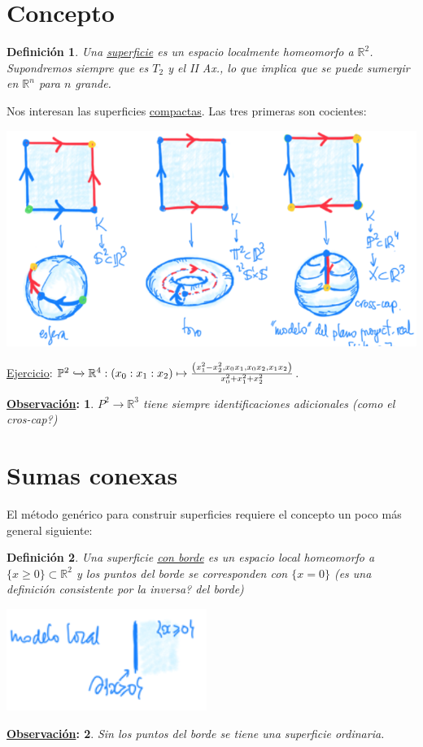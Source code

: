\documentclass[10pt,a4paper,openright]{book}
\theoremstyle{break}
\newtheorem*{defi}{Definición}
\newtheorem*{obs}{\underline{Observación}:}
\begin{document}
\section{Concepto}%
\label{sec:concepto_sup}
\begin{defi}
Una \underline{superficie} es un espacio localmente homeomorfo a $\mathbb{R}^{2}$. Supondremos siempre que es $T_2$ y el II Ax., lo que implica que se puede sumergir en $\mathbb{R}^{n}$ para $n$ grande.
\end{defi}
Nos interesan las superficies \underline{compactas}. Las tres primeras son cocientes:
\begin{center}
    \includegraphics[scale=0.3]{images/primeras_superficies} 
\end{center}
\underline{Ejercicio}: $\mathbb{P}^{2} \xhookrightarrow{} \mathbb{R}^{4}: \left( x_0 : x_1 : x_2 \right) \mapsto \frac{\left( x_1^2 - x_2^2, x_0x_1, x_0x_2, x_1x_2 \right)}{x_0^2 + x_1^2 + x_2^2}$.

\begin{obs}
$P^2 \rightarrow \mathbb{R}^{3}$ tiene siempre identificaciones adicionales (como el cros-cap?)
\end{obs}

\section{Sumas conexas}%
\label{sec:sumas_conexas}
El método genérico para construir superficies requiere el concepto un poco más general siguiente:
\begin{defi}
Una superficie \underline{con borde} es un espacio local homeomorfo a $\{x \ge 0\} \subset \mathbb{R}^{2}$ y los puntos del borde se corresponden con $\{x = 0\}$ (es una definición consistente por la inversa? del borde)
\begin{center}
    \includegraphics[scale=0.3]{images/def_con_borde} 
\end{center}
\end{defi}
\begin{obs}
Sin los puntos del borde se tiene una superficie ordinaria.
\end{obs}
\end{document}
